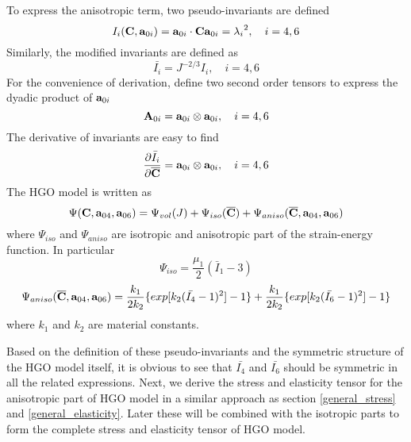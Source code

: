 To express the anisotropic term, two pseudo-invariants are defined
\begin{equation} \label{pseudo-invariants}
I_i(\bold{C}, \bold{a}_{0i}) = \bold{a}_{0i} \cdot \bold{C}\bold{a}_{0i} = {\lambda_i}^2, \quad i = 4, 6
\end{equation}
Similarly, the modified invariants are defined as
\begin{equation}
\bar{I_i} = J^{-2/3}I_i, \quad i = 4, 6
\end{equation}
For the convenience of derivation, define two second order tensors to express the dyadic product of $\bold{a}_{0i}$
\begin{equation} \label{A0i}
\bold{A}_{0i} = \bold{a}_{0i} \otimes \bold{a}_{0i}, \quad i = 4, 6
\end{equation}
The derivative of invariants are easy to find
\begin{equation}
\frac{\partial\bar I_i}{\partial \overline{\bold{C}}} = \bold{a}_{0i} \otimes \bold{a}_{0i}, \quad i = 4, 6
\end{equation}
The HGO model is written as
\begin{equation} \label{HGO}
\Psi(\bold{C}, \bold{a}_{04}, \bold{a}_{06}) = \Psi_{vol}(J) + \Psi_{iso}(\overline{\bold{C}}) + \Psi_{aniso}(\overline{\bold{C}}, \bold{a}_{04}, \bold{a}_{06})
\end{equation}
where $\Psi_{iso}$ and $\Psi_{aniso}$ are isotropic and anisotropic part of the strain-energy function. In particular
\begin{equation} \label{neohookean}
\Psi_{iso} = \frac{\mu_1}{2}(\bar{I}_1 - 3)
\end{equation}
\begin{equation} \label{anisotropic}
\Psi_{aniso}(\overline{\bold{C}}, \bold{a}_{04}, \bold{a}_{06}) = \frac{k_1}{2k_2}\{exp[k_2(\bar{I_4} - 1)^2] - 1\} + \frac{k_1}{2k_2}\{exp[k_2(\bar{I_6} - 1)^2] - 1\}
\end{equation}
where $k_1$ and $k_2$ are material constants.

Based on the definition of these pseudo-invariants and the symmetric structure of the HGO model itself, it is obvious to see that $\bar{I_4}$ and $\bar{I_6}$ should be symmetric in all the related expressions. Next, we derive the stress and elasticity tensor for the anisotropic part of HGO model in a similar approach as section \ref{general_stress} and \ref{general_elasticity}. Later these will be combined with the isotropic parts to form the complete stress and elasticity tensor of HGO model.

